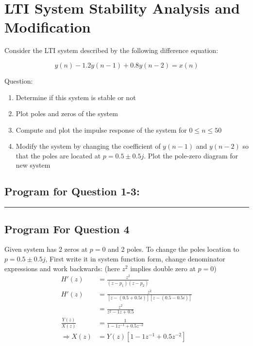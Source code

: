 \section{LTI System Stability Analysis and Modification}
Consider the LTI system described by the following difference equation:

$$y(n)-1.2y(n-1)+0.8y(n-2)=x(n)$$

Question:

\begin{enumerate}
	\item Determine if this system is stable or not
	\item Plot poles and zeros of the system
	\item Compute and plot the impulse response of the system for $0\le n\le 50$
	\item Modify the system by changing the coefficient of $y(n-1)$ and $y(n-2)$ so that the poles are located at $p=0.5\pm 0.5j$. Plot the pole-zero diagram for new system
\end{enumerate}

\subsection*{Program for Question 1-3:}



\begin{figure}[ht!]
	\begin{minipage}{.45\textwidth}
	\end{minipage}%
	\hfill%
	\begin{minipage}{.45\textwidth}
	\end{minipage}
\end{figure}

\hrule
\subsection*{Program For Question 4}
\vspace*{10pt}

Given system has 2 zeros at $p = 0$ and 2 poles. To change the poles location to $p=0.5\pm 0.5j$, First write it in system function form, change denominator expressions and work backwards: (here $z^2$ implies double zero at $p = 0$)
\begin{align*}
	H'(z) &= \frac{z^2}{(z - p_1)(z - p_2)}\\
	H'(z) &= \frac{z^2}{
		\left[z - \left(0.5 + 0.5i\right)\right]
		\left[z - \left(0.5 - 0.5i\right)\right]
	} \\
	 &= \frac{z^2}{z^2 -1z + 0.5} \\
	 \frac{Y(z)}{X(z)} &= \frac{1}{1 -1z^{-1} + 0.5z^{-2}} \\
	 \Rightarrow X(z) &= Y(z)\left[1 -1z^{-1} + 0.5z^{-2}\right]
\end{align*}

